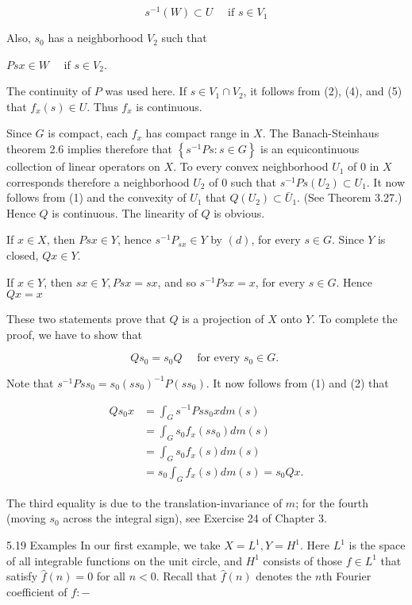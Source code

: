 \documentclass[10pt]{article}
\begin{document}
$$
s^{-1}(W) \subset U \quad \text { if } s \in V_{1}
$$

Also, $s_{0}$ has a neighborhood $V_{2}$ such that

$P s x \in W \quad$ if $s \in V_{2}$.

The continuity of $P$ was used here. If $s \in V_{1} \cap V_{2}$, it follows from (2), (4), and (5) that $f_{x}(s) \in U$. Thus $f_{x}$ is continuous.

Since $G$ is compact, each $f_{x}$ has compact range in $X$. The Banach-Steinhaus theorem 2.6 implies therefore that $\left\{s^{-1} P s: s \in G\right\}$ is an equicontinuous collection of linear operators on $X$. To every convex neighborhood $U_{1}$ of 0 in $X$ corresponds therefore a neighborhood $U_{2}$ of 0 such that $s^{-1} P s\left(U_{2}\right) \subset U_{1}$. It now follows from (1) and the convexity of $U_{1}$ that $Q\left(U_{2}\right) \subset \bar{U}_{1}$. (See Theorem 3.27.) Hence $Q$ is continuous. The linearity of $Q$ is obvious.

If $x \in X$, then $P s x \in Y$, hence $s^{-1} P_{s x} \in Y$ by $(d)$, for every $s \in G$. Since $Y$ is closed, $Q x \in Y$.

If $x \in Y$, then $s x \in Y, P s x=s x$, and so $s^{-1} P s x=x$, for every $s \in G$. Hence $Q x=x$

These two statements prove that $Q$ is a projection of $X$ onto $Y$. To complete the proof, we have to show that

$$
Q s_{0}=s_{0} Q \quad \text { for every } s_{0} \in G \text {. }
$$

Note that $s^{-1} P s s_{0}=s_{0}\left(s s_{0}\right)^{-1} P\left(s s_{0}\right)$. It now follows from (1) and (2) that

$$
\begin{aligned}
Q s_{0} x & =\int_{G} s^{-1} P s s_{0} x d m(s) \\
& =\int_{G} s_{0} f_{x}\left(s s_{0}\right) d m(s) \\
& =\int_{G} s_{0} f_{x}(s) d m(s) \\
& =s_{0} \int_{G} f_{x}(s) d m(s)=s_{0} Q x .
\end{aligned}
$$

The third equality is due to the translation-invariance of $m$; for the fourth (moving $s_{0}$ across the integral sign), see Exercise 24 of Chapter 3.

5.19 Examples In our first example, we take $X=L^{1}, Y=H^{1}$. Here $L^{1}$ is the space of all integrable functions on the unit circle, and $H^{1}$ consists of those $f \in L^{1}$ that satisfy $\hat{f}(n)=0$ for all $n<0$. Recall that $\hat{f}(n)$ denotes the $n$th Fourier coefficient of $f:-$
\end{document}
